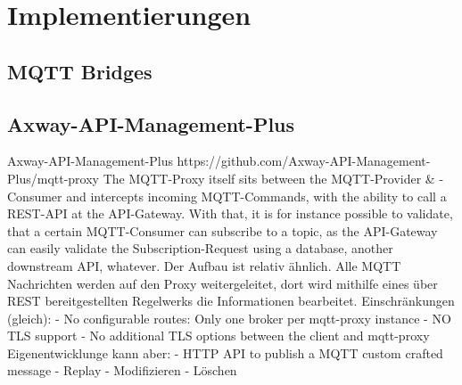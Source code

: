 \section{Implementierungen}
    \subsection{MQTT Bridges}
    
    \subsection{Axway-API-Management-Plus}
    Axway-API-Management-Plus
    https://github.com/Axway-API-Management-Plus/mqtt-proxy
    The MQTT-Proxy itself sits between the MQTT-Provider \& -Consumer and intercepts incoming MQTT-Commands, with the ability to call a REST-API at the API-Gateway. With that, it is for instance possible to validate, that a certain MQTT-Consumer can subscribe to a topic, as the API-Gateway can easily validate the Subscription-Request using a database, another downstream API, whatever.
    Der Aufbau ist relativ ähnlich.
    Alle MQTT Nachrichten werden auf den Proxy weitergeleitet, dort wird mithilfe eines über REST bereitgestellten Regelwerks die Informationen bearbeitet.
    Einschränkungen (gleich):
    - No configurable routes: Only one broker per mqtt-proxy instance
    - NO TLS support
    - No additional TLS options between the client and mqtt-proxy
    Eigenentwicklunge kann aber:
    - HTTP API to publish a MQTT custom crafted message
    - Replay
    - Modifizieren
    - Löschen